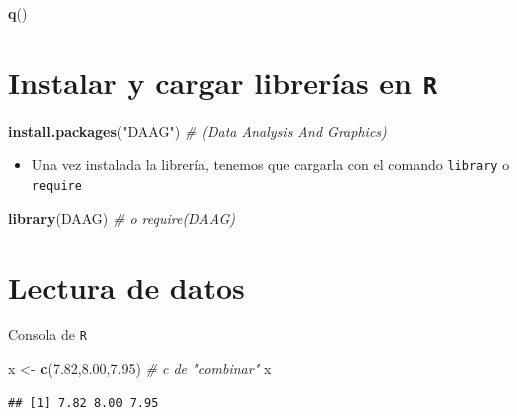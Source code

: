 \documentclass[]{book}
\newenvironment{Shaded}{\begin{snugshade}}{\end{snugshade}}
\newcommand{\KeywordTok}[1]{\textcolor[rgb]{0.13,0.29,0.53}{\textbf{#1}}}
\newcommand{\FloatTok}[1]{\textcolor[rgb]{0.00,0.00,0.81}{#1}}
\newcommand{\StringTok}[1]{\textcolor[rgb]{0.31,0.60,0.02}{#1}}
\newcommand{\CommentTok}[1]{\textcolor[rgb]{0.56,0.35,0.01}{\textit{#1}}}
\newcommand{\NormalTok}[1]{#1}
\providecommand{\tightlist}{%
  \setlength{\itemsep}{0pt}\setlength{\parskip}{0pt}}
\begin{document}
\begin{Shaded}
\begin{Highlighting}[]
\KeywordTok{q}\NormalTok{()}
\end{Highlighting}
\end{Shaded}

\section{\texorpdfstring{Instalar y cargar librerías en
\texttt{R}}{Instalar y cargar librerías en R}}\label{instalar-y-cargar-librerias-en-r}

\begin{Shaded}
\begin{Highlighting}[]
\KeywordTok{install.packages}\NormalTok{(}\StringTok{"DAAG"}\NormalTok{) }\CommentTok{# (Data Analysis And Graphics)}
\end{Highlighting}
\end{Shaded}

\begin{itemize}
\tightlist
\item
  Una vez instalada la librería, tenemos que cargarla con el comando
  \texttt{library} o \texttt{require}
\end{itemize}

\begin{Shaded}
\begin{Highlighting}[]
\KeywordTok{library}\NormalTok{(DAAG) }\CommentTok{# o require(DAAG)}
\end{Highlighting}
\end{Shaded}

\section{Lectura de datos}\label{lectura-de-datos}

Consola de \texttt{R}

\begin{Shaded}
\begin{Highlighting}[]
\NormalTok{x <-}\StringTok{ }\KeywordTok{c}\NormalTok{(}\FloatTok{7.82}\NormalTok{,}\FloatTok{8.00}\NormalTok{,}\FloatTok{7.95}\NormalTok{) }\CommentTok{# c de "combinar"}
\NormalTok{x}
\end{Highlighting}
\end{Shaded}

\begin{verbatim}
## [1] 7.82 8.00 7.95
\end{verbatim}
\end{document}
